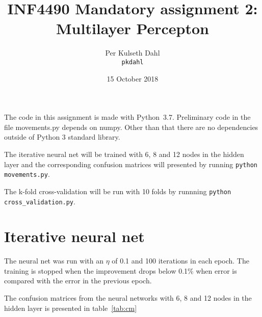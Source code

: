 \documentclass[a4paper]{article}
\title{INF4490 Mandatory assignment 2: \\
  Multilayer Percepton}
\author{Per Kulseth Dahl \\ {\tt pkdahl}}
\date{15 October 2018}
\begin{document}
\maketitle

The code in this assignment is made with Python~3.7.
Preliminary code in the file movements.py depends on numpy.
Other than that there are no dependencies outside of Python 3
standard library.

The iterative neural net will be trained with 6, 8 and 12 nodes in
the hidden layer and the corresponding confusion matrices will
presented by running {\tt python movements.py}.

The k-fold cross-validation will be run with 10 folds by runnning
{\tt python cross\_validation.py}.

\section*{Iterative neural net}

The neural net was run with an $\eta$ of 0.1 and 100 iterations
in each epoch. The training is stopped when the improvement drops
below 0.1\% when error is compared with the error in the previous
epoch.

The confusion matrices from the neural networks with 6, 8 and 12
nodes in the hidden layer is presented in table~\ref{tab:cm}
\end{document}

